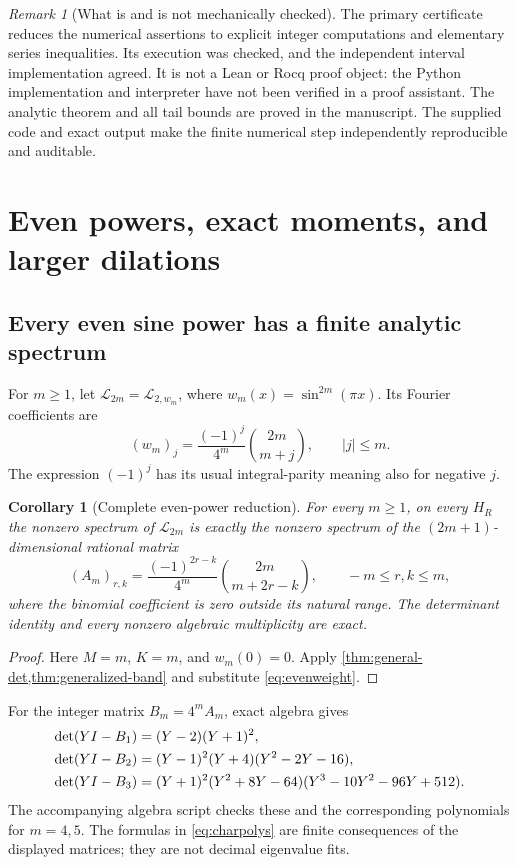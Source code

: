 \documentclass[11pt,a4paper]{article}
\newtheorem{corollary}[theorem]{Corollary}
\theoremstyle{definition}
\theoremstyle{remark}
\newtheorem{remark}[theorem]{Remark}
\newcommand{\Lop}{\mathcal L}
\numberwithin{equation}{section}
\begin{document}
\begin{remark}[What is and is not mechanically checked]
The primary certificate reduces the numerical assertions to explicit
integer computations and elementary series inequalities. Its execution was
checked, and the independent interval implementation agreed. It is not a
Lean or Rocq proof object: the Python implementation and interpreter have
not been verified in a proof assistant. The analytic theorem and all tail
bounds are proved in the manuscript. The supplied code and exact output
make the finite numerical step independently reproducible and auditable.
\end{remark}

\section{Even powers, exact moments, and larger dilations}
\label{sec:evenpowers}

\subsection{Every even sine power has a finite analytic spectrum}
For $m\ge1$, let $\Lop_{2m}=\Lop_{2,w_m}$, where
$w_m(x)=\sin^{2m}(\pi x)$. Its Fourier coefficients are
\begin{equation}
 (w_m)_j=\frac{(-1)^j}{4^m}\binom{2m}{m+j},\qquad |j|\le m.
 \label{eq:evenweight}
\end{equation}
The expression $(-1)^j$ has its usual integral-parity meaning also for
negative $j$.

\begin{corollary}[Complete even-power reduction]
\label{cor:evenpower}
For every $m\ge1$, on every $H_R$ the nonzero spectrum of $\Lop_{2m}$ is
exactly the nonzero spectrum of the $(2m+1)$-dimensional rational matrix
\begin{equation}
 (A_m)_{r,k}=\frac{(-1)^{2r-k}}{4^m}
       \binom{2m}{m+2r-k},\qquad -m\le r,k\le m,
 \label{eq:Am}
\end{equation}
where the binomial coefficient is zero outside its natural range.
The determinant identity and every nonzero algebraic multiplicity are exact.
\end{corollary}
\begin{proof}
Here $M=m$, $K=m$, and $w_m(0)=0$. Apply
\cref{thm:general-det,thm:generalized-band} and substitute
\cref{eq:evenweight}.
\end{proof}

For the integer matrix $B_m=4^mA_m$, exact algebra gives
\begin{align}
 \det(YI-B_1)&=(Y-2)(Y+1)^2,\notag\\
 \det(YI-B_2)&=(Y-1)^2(Y+4)(Y^2-2Y-16),\notag\\
 \det(YI-B_3)&=(Y+1)^2(Y^2+8Y-64)
              (Y^3-10Y^2-96Y+512).
 \label{eq:charpolys}
\end{align}
The accompanying algebra script checks these and the corresponding
polynomials for $m=4,5$. The formulas in \cref{eq:charpolys} are finite
consequences of the displayed matrices; they are not decimal eigenvalue
fits.
\end{document}
